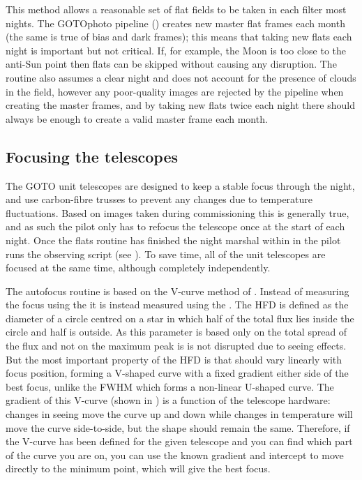 \begin{colsection}
\begin{colsection}
This method allows a reasonable set of flat fields to be taken in each filter most nights. The GOTOphoto pipeline () creates new master flat frames each month (the same is true of bias and dark frames); this means that taking new flats each night is important but not critical. If, for example, the Moon is too close to the anti-Sun point then flats can be skipped without causing any disruption. The routine also assumes a clear night and does not account for the presence of clouds in the field, however any poor-quality images are rejected by the pipeline when creating the master frames, and by taking new flats twice each night there should always be enough to create a valid master frame each month.

\end{colsection}


\subsection{Focusing the telescopes}
\label{sec:autofocus}
\begin{colsection}

The GOTO unit telescopes are designed to keep a stable focus through the night, and use carbon-fibre trusses to prevent any changes due to temperature fluctuations. Based on images taken during commissioning this is generally true, and as such the pilot only has to refocus the telescope once at the start of each night. Once the flats routine has finished the night marshal within in the pilot runs the  observing script (see ). To save time, all of the unit telescopes are focused at the same time, although completely independently.

The autofocus routine is based on the V-curve method of \citet{autofocus}. Instead of measuring the focus using the  it is instead measured using the . The HFD is defined as the diameter of a circle centred on a star in which half of the total flux lies inside the circle and half is outside. As this parameter is based only on the total spread of the flux and not on the maximum peak is is not disrupted due to seeing effects. But the most important property of the HFD is that should vary linearly with focus position, forming a V-shaped curve with a fixed gradient either side of the best focus, unlike the FWHM which forms a non-linear U-shaped curve. The gradient of this V-curve (shown in ) is a function of the telescope hardware: changes in seeing move the curve up and down while changes in temperature will move the curve side-to-side, but the shape should remain the same. Therefore, if the V-curve has been defined for the given telescope and you can find which part of the curve you are on, you can use the known gradient and intercept to move directly to the minimum point, which will give the best focus.


\end{colsection}
\end{colsection}
